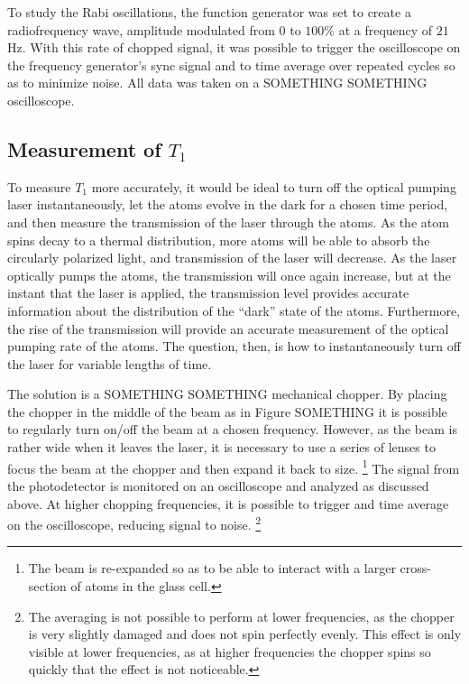 To study the Rabi oscillations, the function generator was set to create a radiofrequency wave, amplitude modulated from $0$ to $100\%$ at a frequency of $21$ Hz. With this rate of chopped signal, it was possible to trigger the oscilloscope on the frequency generator's sync signal and to time average over repeated cycles so as to minimize noise. All data was taken on a SOMETHING SOMETHING oscilloscope.

\subsection{Measurement of $T_{1}$}\label{measurementoft1}

To measure $T_{1}$ more accurately, it would be ideal to turn off the optical pumping laser instantaneously, let the atoms evolve in the dark for a chosen time period, and then measure the transmission of the laser through the atoms. As the atom spins decay to a thermal distribution, more atoms will be able to absorb the circularly polarized light, and transmission of the laser will decrease. As the laser optically pumps the atoms, the transmission will once again increase, but at the instant that the laser is applied, the transmission level provides accurate information about the distribution of the ``dark'' state of the atoms. Furthermore, the rise of the transmission will provide an accurate measurement of the optical pumping rate of the atoms. The question, then, is how to instantaneously turn off the laser for variable lengths of time.

The solution is a SOMETHING SOMETHING mechanical chopper. By placing the chopper in the middle of the beam as in Figure SOMETHING it is possible to regularly turn on/off the beam at a chosen frequency. However, as the beam is rather wide when it leaves the laser, it is necessary to use a series of lenses to focus the beam at the chopper and then expand it back to size. \footnote{The beam is re-expanded so as to be able to interact with a larger cross-section of atoms in the glass cell.} The signal from the photodetector is monitored on an oscilloscope and analyzed as discussed above. At higher chopping frequencies, it is possible to trigger and time average on the oscilloscope, reducing signal to noise. \footnote{The averaging is not possible to perform at lower frequencies, as the chopper is very slightly damaged and does not spin perfectly evenly. This effect is only visible at lower frequencies, as at higher frequencies the chopper spins so quickly that the effect is not noticeable.}

